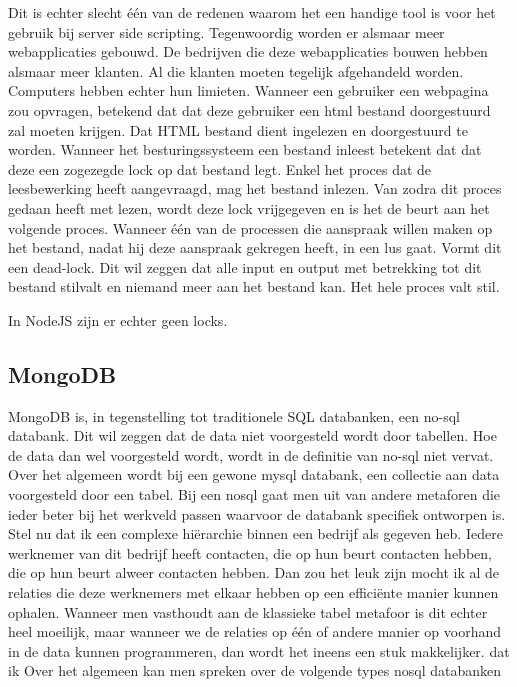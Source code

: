 \documentclass[a4paper,11pt]{article}
\begin{document}
Dit is echter slecht één van de redenen waarom het een handige tool is voor het gebruik bij server side scripting. Tegenwoordig worden er alsmaar meer webapplicaties gebouwd. De bedrijven die deze webapplicaties bouwen hebben alsmaar meer klanten. Al die klanten moeten tegelijk afgehandeld worden. Computers hebben echter hun limieten. Wanneer een gebruiker een webpagina zou opvragen, betekend dat dat deze gebruiker een html bestand doorgestuurd zal moeten krijgen. Dat HTML bestand dient ingelezen en doorgestuurd te worden. Wanneer het besturingssysteem een bestand inleest betekent dat dat deze een zogezegde lock op dat bestand legt. Enkel het proces dat de leesbewerking heeft aangevraagd, mag het bestand inlezen. Van zodra dit proces gedaan heeft met lezen, wordt deze lock vrijgegeven en is het de beurt aan het volgende proces. Wanneer één van de processen die aanspraak willen maken op het bestand, nadat hij deze aanspraak gekregen heeft, in een lus gaat. Vormt dit een dead-lock. Dit wil zeggen dat alle input en output met betrekking tot dit bestand stilvalt en niemand meer aan het bestand kan. Het hele proces valt stil.

In NodeJS zijn er echter geen locks.

\subsection{MongoDB}
MongoDB is, in tegenstelling tot traditionele SQL databanken, een 
no-sql databank. Dit wil zeggen dat de data niet voorgesteld wordt door 
tabellen. Hoe de data dan wel voorgesteld wordt, wordt in de definitie 
van no-sql niet vervat. Over het algemeen wordt bij een gewone mysql 
databank, een collectie aan data voorgesteld door een tabel. Bij een 
nosql gaat men uit van andere metaforen die ieder beter bij het 
werkveld passen waarvoor de databank specifiek ontworpen is. Stel nu 
dat ik een complexe hiërarchie binnen een bedrijf als gegeven heb. 
Iedere werknemer van dit bedrijf heeft contacten, die op hun beurt 
contacten hebben, die op hun beurt alweer contacten hebben. Dan zou 
het leuk zijn mocht ik al de relaties die deze werknemers met elkaar 
hebben op een efficiënte manier kunnen ophalen. Wanneer men vasthoudt 
aan de klassieke tabel metafoor is dit echter heel moeilijk, maar 
wanneer we de relaties op één of andere manier op voorhand in de data 
kunnen programmeren, dan wordt het ineens een stuk makkelijker.
dat ik  Over het algemeen kan men spreken over de 
volgende types nosql databanken
\end{document}
